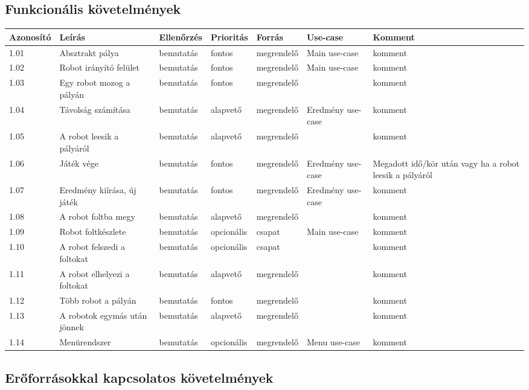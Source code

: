 \subsection{Funkcionális követelmények}


\begin{longtable}{| l | l | l | l | l | l | l |}
\hline
\textbf{Azonosító}   & \textbf{Leírás} & \textbf{Ellenőrzés} & \textbf{Prioritás} & \textbf{Forrás} & \textbf{Use-case} & \textbf{Komment} \tabularnewline
\hline\hline
1.01 & Absztrakt pálya & bemutatás & fontos & megrendelő & Main use-case & komment \tabularnewline
\hline
1.02 & Robot irányító felület & bemutatás & fontos & megrendelő & Main use-case & komment \tabularnewline
\hline
1.03 & Egy robot mozog a pályán & bemutatás & fontos & megrendelő &  & komment \tabularnewline
\hline
1.04 & Távolság számítása & bemutatás & alapvető & megrendelő & Eredmény use-case & komment \tabularnewline
\hline
1.05 & A robot leesik a pályáról & bemutatás & alapvető & megrendelő &  & komment \tabularnewline
\hline
1.06 & Játék vége & bemutatás & fontos & megrendelő & Eredmény use-case & Megadott idő/kör után vagy ha a robot leesik a pályáról \tabularnewline
\hline
1.07 & Eredmény kiírása, új játék & bemutatás & fontos & megrendelő & Eredmény use-case & komment \tabularnewline
\hline
1.08 & A robot foltba megy& bemutatás & alapvető & megrendelő &  & komment \tabularnewline
\hline
1.09 & Robot foltkészlete & bemutatás & opcionális & csapat & Main use-case & komment \tabularnewline
\hline
1.10 & A robot felszedi a foltokat & bemutatás & opcionális & csapat &  & komment \tabularnewline
\hline
1.11 & A robot elhelyezi a foltokat & bemutatás & alapvető & megrendelő &  & komment \tabularnewline
\hline
1.12 & Több robot a pályán & bemutatás & fontos & megrendelő &  & komment \tabularnewline
\hline
1.13 & A robotok egymás után jönnek & bemutatás & alapvető & megrendelő &  & komment \tabularnewline
\hline
1.14 & Menürendszer & bemutatás & opcionális & megrendelő & Menu use-case & komment \tabularnewline
\hline
\end{longtable}

\subsection{Erőforrásokkal kapcsolatos követelmények}

